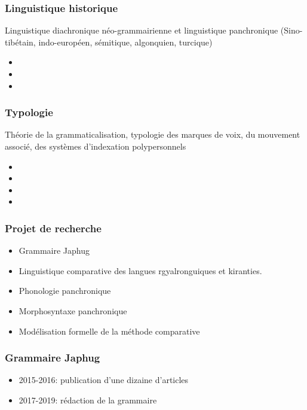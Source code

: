 \documentclass[xcolor=table]{beamer}
\begin{document}
   \begin{frame} 
 \frametitle{Linguistique historique} 
 
 Linguistique diachronique néo-grammairienne et linguistique panchronique (Sino-tibétain, indo-européen, sémitique, algonquien, turcique)
 \begin{itemize}%
\item {}  
\item {}  
\item {}  
\end{itemize}
   \end{frame} 
   
   \begin{frame} 
 \frametitle{Typologie} 
 
 Théorie de la grammaticalisation, typologie des marques de voix, du mouvement associé, des systèmes d'indexation polypersonnels
 \begin{itemize}%
\item {}  
\item {}  
\item {}  
\item {}  
\end{itemize}
   \end{frame} 
    
  \begin{frame} 
 \frametitle{Projet de recherche} 
 

\begin{itemize}%
\item Grammaire Japhug
\item Linguistique comparative des langues rgyalronguiques et kiranties.
\item Phonologie panchronique
\item Morphosyntaxe panchronique  
\item Modélisation formelle de la méthode comparative 
\end{itemize}
   
  \end{frame}   

   \begin{frame} 
 \frametitle{Grammaire Japhug} 
 \begin{itemize}%
 \item 2015-2016: publication d'une dizaine d'articles
\item 2017-2019: rédaction de la grammaire
\end{itemize}
   \end{frame} 
   
\end{document}

